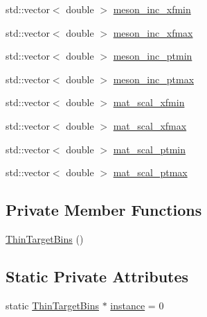 \begin{DoxyCompactItemize}
std\-::vector$<$ double $>$ \hyperlink{class_neutrino_flux_reweight_1_1_thin_target_bins_a9693301d7ded98e2204a8f8a001beae6}{meson\-\_\-inc\-\_\-xfmin}
\item 
std\-::vector$<$ double $>$ \hyperlink{class_neutrino_flux_reweight_1_1_thin_target_bins_ae58bdf98e3c4106b89e2764217a5a556}{meson\-\_\-inc\-\_\-xfmax}
\item 
std\-::vector$<$ double $>$ \hyperlink{class_neutrino_flux_reweight_1_1_thin_target_bins_af50653a9d0674d3e679dcb93292b6465}{meson\-\_\-inc\-\_\-ptmin}
\item 
std\-::vector$<$ double $>$ \hyperlink{class_neutrino_flux_reweight_1_1_thin_target_bins_a16268b1a0d1587fb12a37a7e4c733ccc}{meson\-\_\-inc\-\_\-ptmax}
\item 
std\-::vector$<$ double $>$ \hyperlink{class_neutrino_flux_reweight_1_1_thin_target_bins_a982880bd093577f25bf0346363107c08}{mat\-\_\-scal\-\_\-xfmin}
\item 
std\-::vector$<$ double $>$ \hyperlink{class_neutrino_flux_reweight_1_1_thin_target_bins_a24f7ec140608998c8dda3786db5626c3}{mat\-\_\-scal\-\_\-xfmax}
\item 
std\-::vector$<$ double $>$ \hyperlink{class_neutrino_flux_reweight_1_1_thin_target_bins_a232982a9fdc911e774661fb9a0202d38}{mat\-\_\-scal\-\_\-ptmin}
\item 
std\-::vector$<$ double $>$ \hyperlink{class_neutrino_flux_reweight_1_1_thin_target_bins_a0da8c145948fc4c4bad92a3ef75e3694}{mat\-\_\-scal\-\_\-ptmax}
\end{DoxyCompactItemize}
\subsection*{Private Member Functions}
\begin{DoxyCompactItemize}
\item 
\hyperlink{class_neutrino_flux_reweight_1_1_thin_target_bins_a008d2f5eb185a148d7e9692e85697711}{Thin\-Target\-Bins} ()
\end{DoxyCompactItemize}
\subsection*{Static Private Attributes}
\begin{DoxyCompactItemize}
\item 
static \hyperlink{class_neutrino_flux_reweight_1_1_thin_target_bins}{Thin\-Target\-Bins} $\ast$ \hyperlink{class_neutrino_flux_reweight_1_1_thin_target_bins_a235030b92953c5711c0a47cec4dae198}{instance} = 0
\end{DoxyCompactItemize}


